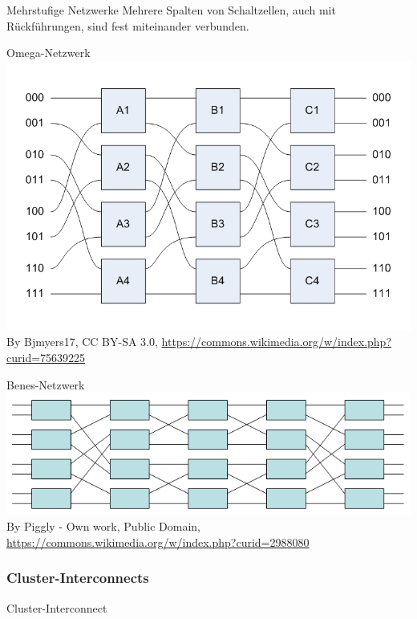 \begin{defi}{Mehrstufige Netzwerke}
    Mehrere Spalten von Schaltzellen, auch mit Rückführungen, 
    sind fest miteinander verbunden.
\end{defi}

\begin{defi}{Omega-Netzwerk}
    \includegraphics[width = \textwidth]{includes/graphics/OmegaNetwork.jpg}
    By Bjmyers17, CC BY-SA 3.0, \url{https://commons.wikimedia.org/w/index.php?curid=75639225}
\end{defi}

\begin{defi}{Benes-Netzwerk}
    \includegraphics[width = \textwidth]{includes/graphics/Benesnetwork.png}
    By Piggly - Own work, Public Domain, \url{https://commons.wikimedia.org/w/index.php?curid=2988080}
\end{defi}

\subsubsection{Cluster-Interconnects}

\begin{defi}{Cluster-Interconnect}
    
\end{defi}

